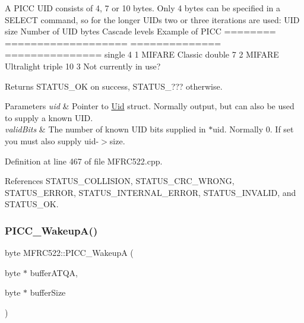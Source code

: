 A P\+I\+CC U\+ID consists of 4, 7 or 10 bytes. Only 4 bytes can be specified in a S\+E\+L\+E\+CT command, so for the longer U\+I\+Ds two or three iterations are used\+: U\+ID size Number of U\+ID bytes Cascade levels Example of P\+I\+CC ======== =================== ============== =============== single 4 1 M\+I\+F\+A\+RE Classic double 7 2 M\+I\+F\+A\+RE Ultralight triple 10 3 Not currently in use?

\begin{DoxyReturn}{Returns}
S\+T\+A\+T\+U\+S\+\_\+\+OK on success, S\+T\+A\+T\+U\+S\+\_\+??? otherwise. 
\end{DoxyReturn}

\begin{DoxyParams}{Parameters}
{\em uid} & Pointer to \hyperlink{struct_m_f_r_c522_1_1_uid}{Uid} struct. Normally output, but can also be used to supply a known U\+ID. \\
\hline
{\em valid\+Bits} & The number of known U\+ID bits supplied in $\ast$uid. Normally 0. If set you must also supply uid-\/$>$size. \\
\hline
\end{DoxyParams}


Definition at line 467 of file M\+F\+R\+C522.\+cpp.



References S\+T\+A\+T\+U\+S\+\_\+\+C\+O\+L\+L\+I\+S\+I\+ON, S\+T\+A\+T\+U\+S\+\_\+\+C\+R\+C\+\_\+\+W\+R\+O\+NG, S\+T\+A\+T\+U\+S\+\_\+\+E\+R\+R\+OR, S\+T\+A\+T\+U\+S\+\_\+\+I\+N\+T\+E\+R\+N\+A\+L\+\_\+\+E\+R\+R\+OR, S\+T\+A\+T\+U\+S\+\_\+\+I\+N\+V\+A\+L\+ID, and S\+T\+A\+T\+U\+S\+\_\+\+OK.

\mbox{\label{class_m_f_r_c522_a009dfa9138c6f999af82d7fc5b17a272}} 
\subsubsection{\texorpdfstring{P\+I\+C\+C\+\_\+\+Wakeup\+A()}{PICC\_WakeupA()}}
{\footnotesize\ttfamily byte M\+F\+R\+C522\+::\+P\+I\+C\+C\+\_\+\+WakeupA (\begin{DoxyParamCaption}\item[{byte $\ast$}]{buffer\+A\+T\+QA,  }\item[{byte $\ast$}]{buffer\+Size }\end{DoxyParamCaption})}

